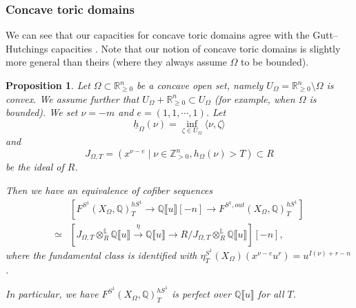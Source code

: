 \documentclass[11pt]{amsart}
\numberwithin{equation}{section}
\theoremstyle{plain}
\newtheorem{Prop}[prop]{Proposition}
\theoremstyle{definition}
\theoremstyle{remark}
\newcommand{\bQ} { {\mathbb{Q}}}
\newcommand{\bZ} { {\mathbb{Z}}}
\newcommand{\bR} { {\mathbb{R}}}
\newcommand{\fpw}[1]{{\llbracket #1\rrbracket}}
\begin{document}
\subsubsection{Concave toric domains}
We can see that our capacities for concave toric domains agree with the Gutt--Hutchings capacities \cite[Theorem 1.14]{gutthutchings2018capacities}. Note that our notion of concave toric domains is slightly more general than theirs (where they always assume $\Omega$ to be bounded).

\begin{Prop}\label{prop: concave computation}Let $\Omega \subset \bR^n_{\geq0}$ be a concave open set, namely $U_{\Omega}=\mathbb R_{\geq0}^n\setminus\Omega$ is convex. We assume further that $U_\Omega+\bR^n_{\geq 0} \subset U_\Omega$ (for example, when $\Omega$ is bounded).
We set $\nu=-m$ and $e=(1,1,\cdots,1)$. Let 
\[\underline{h}_\Omega(\nu)=\inf_{\zeta\in {U_{\Omega}}}\langle \nu,\zeta\rangle \] and 
\[J_{\Omega,T}=(x^{\nu-e} \mid \nu\in \bZ^n_{>0},h_\Omega(\nu)> T )\subset R\]
be the ideal of $R$. 

Then we have an equivalence of cofiber sequences
\begin{align*}
    &\left[F^{S^1}(X_\Omega,\bQ)_T^{hS^1}\to \bQ\fpw{u}[-n] \to F^{S^1,out}(X_\Omega,\bQ)_T^{hS^1}\right]   \\
    \simeq &\left[J_{\Omega,T}\otimes_R^{\mathbb{L}} \bQ\fpw{u} \xrightarrow{\eta}  \bQ\fpw{u} \to R/J_{\Omega,T}\otimes_R^{\mathbb{L}} \bQ\fpw{u}\right][-n],
\end{align*}
where the fundamental class is identified with $\eta_T^{S^1}(X_\Omega)(x^{\nu-e} u^r)=u^{I(\nu)+r-n}$.

In particular, we have $F^{S^1}(X_\Omega,\bQ)_T^{hS^1}$ is perfect over $\bQ\fpw{u}$ for all $T$.
\end{Prop}
\end{document}
